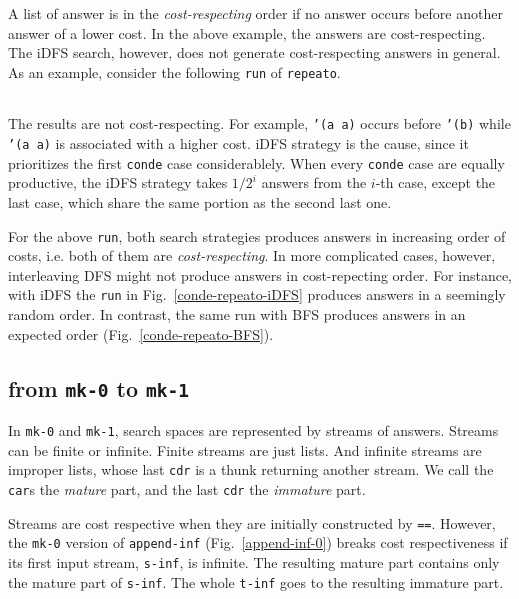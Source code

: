 \documentclass[format=acmlarge, review=true, authordraft=true]{acmart}
\begin{document}
A list of answer is in the \emph{cost-respecting} order if no answer occurs
before another answer of a lower cost. In the above example, the answers are
cost-respecting. The iDFS search, however, does not generate cost-respecting
answers in general. As an example, consider the following \texttt{run} of
\texttt{repeato}.
\begin{center}
  \begin{tabular}{c}
   
   \end{tabular}
\end{center}

The results are not cost-respecting. For example, \texttt{'(a a)} occurs before
\texttt{'(b)} while \texttt{'(a a)} is associated with a higher cost. 
iDFS strategy is the cause, since it prioritizes the first \texttt{conde} case
considerablely. When every \texttt{conde} case are equally productive, the iDFS
strategy takes $1/2^{i}$ answers from the $i$-th case, except the last case,
which share the same portion as the second last one.


For the above \texttt{run}, both search strategies produces answers in increasing
order of costs, i.e. both of them are \emph{cost-respecting}. In more complicated
cases, however, interleaving DFS might not produce answers in cost-repecting order.
For instance, with iDFS the \texttt{run} in Fig.~\ref{conde-repeato-iDFS} produces
answers in a seemingly random order. In contrast, the same run with BFS produces
answers in an expected order (Fig.~\ref{conde-repeato-BFS}).



\subsection{from \texttt{mk-0} to \texttt{mk-1}}

In \texttt{mk-0} and \texttt{mk-1}, search spaces are represented by streams of answers. Streams can be finite or infinite. Finite streams are just lists. And infinite streams are improper lists, whose last \texttt{cdr} is a thunk returning another stream. We call the \texttt{car}s the \emph{mature} part, and the last \texttt{cdr} the \emph{immature} part. 

Streams are cost respective when they are initially constructed by \texttt{==}. However, the \texttt{mk-0} version of \texttt{append-inf} (Fig.~\ref{append-inf-0}) breaks cost respectiveness if its first input stream, \texttt{s-inf}, is infinite. The resulting mature part contains only the mature part of \texttt{s-inf}. The whole \texttt{t-inf} goes to the resulting immature part.
\end{document}
